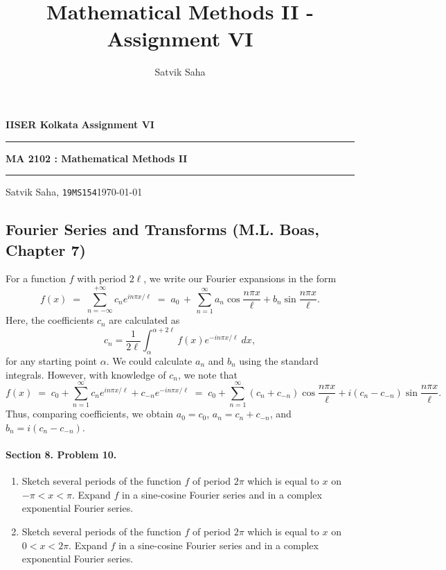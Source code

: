 \documentclass[10pt]{article}
\title{Mathematical Methods II - Assignment VI}
\author{Satvik Saha}
\date{}
\begin{document}
        \par\textbf{IISER Kolkata} \hfill \textbf{Assignment VI}
        \vspace{3pt}
        \hrule
        \vspace{3pt}
        \begin{center}
                \LARGE{\textbf{MA 2102 : Mathematical Methods II}}
        \end{center}
        \vspace{3pt}
        \hrule
        \vspace{3pt}
        Satvik Saha, \texttt{19MS154}\hfill\today
        \vspace{20pt}
        \subsection*{Fourier Series and Transforms (M.L. Boas, Chapter 7)}

        For a function $f$ with period $2\ell$, we write our Fourier expansions in the form
        \[
                f(x) \;=\; \sum_{n = -\infty}^{+\infty} c_n e^{in\pi x/\ell} 
                        \;=\; a_0 \,+\, \sum_{n = 1}^\infty a_n\cos\frac{n\pi x}{\ell} + b_n\sin\frac{n\pi x}{\ell}.
        \]
        Here, the coefficients $c_n$ are calculated as 
        \[
                c_n = \frac{1}{2\ell}\int_{\alpha}^{\alpha + 2\ell} f(x)e^{-in\pi x/\ell}\: dx,
        \]
        for any starting point $\alpha$.
        We could calculate $a_n$ and $b_n$ using the standard integrals. However, with knowledge of $c_n$, we note that
        \[
                f(x) \;=\; c_0 + \sum_{n = 1}^{\infty} c_ne^{in\pi x/\ell} + c_{-n}e^{-in\pi x/\ell} 
                        \;=\; c_0 + \sum_{n = 1}^\infty (c_n + c_{-n})\cos\frac{n\pi x}{\ell} + i(c_n - c_{-n})\sin\frac{n\pi x}{\ell}.
        \]
        Thus, comparing coefficients, we obtain $a_0 = c_0$, $a_n = c_n + c_{-n}$, and $b_n = i(c_n - c_{-n})$.
        
        \paragraph{Section 8. Problem 10.}
        \begin{enumerate}
                \item Sketch several periods of the function $f$ of period $2\pi$ which is equal to $x$ on $-\pi < x < \pi$.
                Expand $f$ in a sine-cosine Fourier series and in a complex exponential Fourier series.
                
                \item Sketch several periods of the function $f$ of period $2\pi$ which is equal to $x$ on $0 < x < 2\pi$.
                Expand $f$ in a sine-cosine Fourier series and in a complex exponential Fourier series.
        \end{enumerate}
\end{document}
